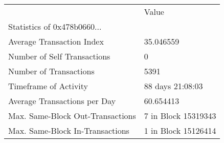 \begin{tabular}{ll}
\toprule
{} &                Value \\
Statistics of 0x478b0660...      &                      \\
\midrule
Average Transaction Index        &            35.046559 \\
Number of Self Transactions      &                    0 \\
Number of Transactions           &                 5391 \\
Timeframe of Activity            &     88 days 21:08:03 \\
Average Transactions per Day     &            60.654413 \\
Max. Same-Block Out-Transactions &  7 in Block 15319343 \\
Max. Same-Block In-Transactions  &  1 in Block 15126414 \\
\bottomrule
\end{tabular}
